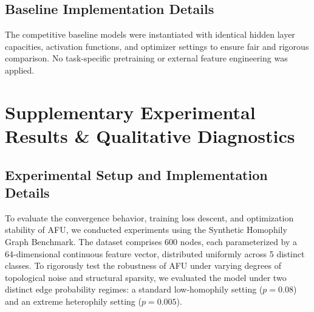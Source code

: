 \documentclass[10pt,twocolumn]{article}
\begin{document}
\begin{table}[htbp]
\centering
\caption{\textbf{Standardized hyperparameter configurations for the proposed framework and baselines.}}
\label{tab:hyperparameters}
\end{table}

\subsection{Baseline Implementation Details}
The competitive baseline models were instantiated with identical hidden layer capacities, activation functions, and optimizer settings to ensure fair and rigorous comparison. No task-specific pretraining or external feature engineering was applied.

\section{Supplementary Experimental Results \& Qualitative Diagnostics}
\subsection{Experimental Setup and Implementation Details}
To evaluate the convergence behavior, training loss descent, and optimization stability of \textsc{AFU}, we conducted experiments using the Synthetic Homophily Graph Benchmark. The dataset comprises 600 nodes, each parameterized by a 64-dimensional continuous feature vector, distributed uniformly across 5 distinct classes. To rigorously test the robustness of \textsc{AFU} under varying degrees of topological noise and structural sparsity, we evaluated the model under two distinct edge probability regimes: a standard low-homophily setting ($p = 0.08$) and an extreme heterophily setting ($p = 0.005$). 
\end{document}

